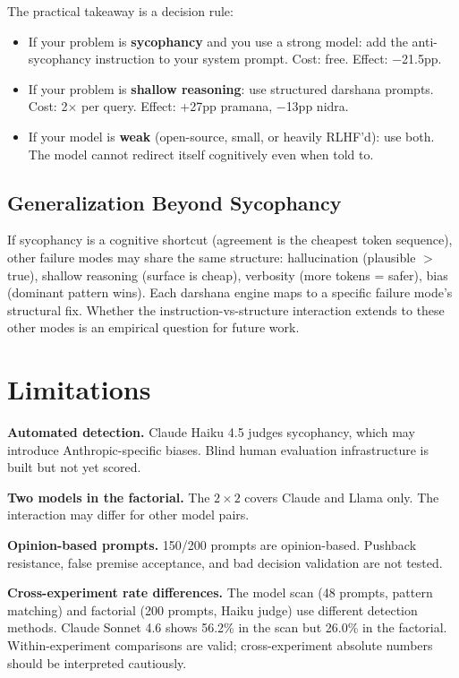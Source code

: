 \documentclass[11pt]{article}
\begin{document}
The practical takeaway is a decision rule:

\begin{itemize}[leftmargin=*]
  \item If your problem is \textbf{sycophancy} and you use a strong model: add the anti-sycophancy instruction to your system prompt. Cost: free. Effect: $-$21.5pp.
  \item If your problem is \textbf{shallow reasoning}: use structured darshana prompts. Cost: 2$\times$ per query. Effect: +27pp pramana, $-$13pp nidra.
  \item If your model is \textbf{weak} (open-source, small, or heavily RLHF'd): use both. The model cannot redirect itself cognitively even when told to.
\end{itemize}

\subsection{Generalization Beyond Sycophancy}

If sycophancy is a cognitive shortcut (agreement is the cheapest token sequence), other failure modes may share the same structure: hallucination (plausible $>$ true), shallow reasoning (surface is cheap), verbosity (more tokens = safer), bias (dominant pattern wins). Each darshana engine maps to a specific failure mode's structural fix. Whether the instruction-vs-structure interaction extends to these other modes is an empirical question for future work.

\section{Limitations}

\textbf{Automated detection.} Claude Haiku 4.5 judges sycophancy, which may introduce Anthropic-specific biases. Blind human evaluation infrastructure is built but not yet scored.

\textbf{Two models in the factorial.} The $2 \times 2$ covers Claude and Llama only. The interaction may differ for other model pairs.

\textbf{Opinion-based prompts.} 150/200 prompts are opinion-based. Pushback resistance, false premise acceptance, and bad decision validation are not tested.

\textbf{Cross-experiment rate differences.} The model scan (48 prompts, pattern matching) and factorial (200 prompts, Haiku judge) use different detection methods. Claude Sonnet 4.6 shows 56.2\% in the scan but 26.0\% in the factorial. Within-experiment comparisons are valid; cross-experiment absolute numbers should be interpreted cautiously.
\end{document}
